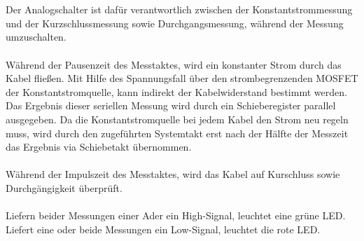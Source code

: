 \documentclass[a4paper,11pt]{scrartcl}
\begin{document}
\\
\\
Der Analogschalter ist dafür verantwortlich zwischen der Konstantstrommessung und der Kurzschlussmessung sowie Durchgangsmessung, während der Messung umzuschalten. 
\\
\\
Während der Pausenzeit des Messtaktes, wird ein konstanter Strom durch das Kabel fließen. Mit Hilfe des Spannungsfall über den strombegrenzenden MOSFET der Konstantstromquelle, kann indirekt der Kabelwiderstand bestimmt werden. Das Ergebnis dieser seriellen Messung wird durch ein Schieberegister parallel ausgegeben. Da die Konstantstromquelle bei jedem Kabel den Strom neu regeln muss, wird durch den zugeführten Systemtakt erst nach der Hälfte der Messzeit das Ergebnis via Schiebetakt übernommen.
\\
\\
Während der Impulszeit des Messtaktes, wird das Kabel auf Kurschluss sowie Durchgängigkeit überprüft. 
\\
\\
Liefern beider Messungen einer Ader ein High-Signal, leuchtet eine grüne LED. Liefert eine oder beide Messungen ein Low-Signal, leuchtet die rote LED.
\end{document}
